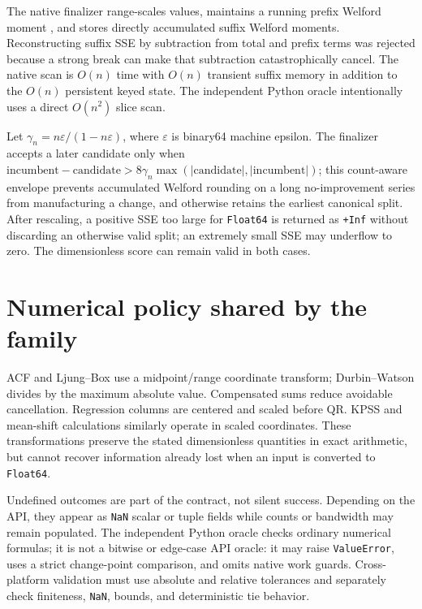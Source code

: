 \documentclass[11pt]{article}
\begin{document}
The native finalizer range-scales values, maintains a running prefix Welford moment \cite{welford1962,chan1983}, and stores directly accumulated suffix Welford moments. Reconstructing suffix SSE by subtraction from total and prefix terms was rejected because a strong break can make that subtraction catastrophically cancel. The native scan is $O(n)$ time with $O(n)$ transient suffix memory in addition to the $O(n)$ persistent keyed state. The independent Python oracle intentionally uses a direct $O(n^2)$ slice scan.

Let $\gamma_n=n\varepsilon/(1-n\varepsilon)$, where $\varepsilon$ is binary64 machine epsilon. The finalizer accepts a later candidate only when $\mathrm{incumbent}-\mathrm{candidate}>8\gamma_n\max(|\mathrm{candidate}|,|\mathrm{incumbent}|)$; this count-aware envelope prevents accumulated Welford rounding on a long no-improvement series from manufacturing a change, and otherwise retains the earliest canonical split. After rescaling, a positive SSE too large for \texttt{Float64} is returned as \texttt{+Inf} without discarding an otherwise valid split; an extremely small SSE may underflow to zero. The dimensionless score can remain valid in both cases.

\section{Numerical policy shared by the family}

ACF and Ljung--Box use a midpoint/range coordinate transform; Durbin--Watson divides by the maximum absolute value. Compensated sums reduce avoidable cancellation. Regression columns are centered and scaled before QR. KPSS and mean-shift calculations similarly operate in scaled coordinates. These transformations preserve the stated dimensionless quantities in exact arithmetic, but cannot recover information already lost when an input is converted to \texttt{Float64}.

Undefined outcomes are part of the contract, not silent success. Depending on the API, they appear as \texttt{NaN} scalar or tuple fields while counts or bandwidth may remain populated. The independent Python oracle checks ordinary numerical formulas; it is not a bitwise or edge-case API oracle: it may raise \texttt{ValueError}, uses a strict change-point comparison, and omits native work guards. Cross-platform validation must use absolute and relative tolerances and separately check finiteness, \texttt{NaN}, bounds, and deterministic tie behavior.
\end{document}
